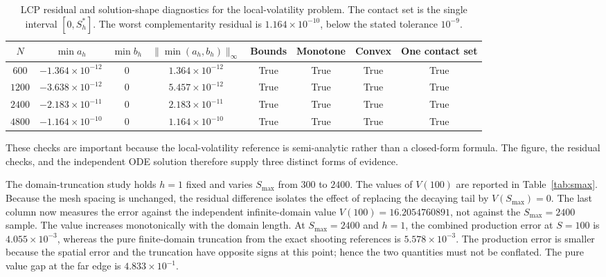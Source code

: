 \documentclass[11pt,a4paper]{article}
\theoremstyle{definition}
\theoremstyle{remark}
\begin{document}
\begin{table}[H]
\centering
\scriptsize
\setlength{\tabcolsep}{4pt}
\begin{tabular}{cccccccc}
\toprule
\textbf{$N$} & \textbf{$\min a_h$} & \textbf{$\min b_h$} &
\textbf{$\|\min(a_h,b_h)\|_\infty$} & \textbf{Bounds} &
\textbf{Monotone} & \textbf{Convex} & \textbf{One contact set} \\
\midrule
$600$  & $-1.364\times10^{-12}$ & $0$ & $1.364\times10^{-12}$ &
True & True & True & True \\
$1200$ & $-3.638\times10^{-12}$ & $0$ & $5.457\times10^{-12}$ &
True & True & True & True \\
$2400$ & $-2.183\times10^{-11}$ & $0$ & $2.183\times10^{-11}$ &
True & True & True & True \\
$4800$ & $-1.164\times10^{-10}$ & $0$ & $1.164\times10^{-10}$ &
True & True & True & True \\
\bottomrule
\end{tabular}
\caption{LCP residual and solution-shape diagnostics for the local-volatility
problem. The contact set is the single interval $[0,S_h^*]$. The worst
complementarity residual is $1.164\times10^{-10}$, below the stated
tolerance $10^{-9}$.}
\label{tab:stage2-diagnostics}
\end{table}

These checks are important because the local-volatility reference is
semi-analytic rather than a closed-form formula. The figure, the residual
checks, and the independent ODE solution therefore supply three distinct
forms of evidence.

The domain-truncation study holds $h=1$ fixed and varies $S_{\max}$ from
$300$ to $2400$. The values of $V(100)$ are reported in
Table~\ref{tab:smax}. Because the mesh spacing is unchanged, the residual
difference isolates the effect of replacing the decaying tail by
$V(S_{\max})=0$. The last column now measures the error against the
independent infinite-domain value $V(100)=16.2054760891$, not against the
$S_{\max}=2400$ sample. The value increases monotonically with the domain
length. At $S_{\max}=2400$ and $h=1$, the combined production error at
$S=100$ is $4.055\times10^{-3}$, whereas the pure finite-domain truncation
from the exact shooting references is $5.578\times10^{-3}$. The production
error is smaller because the spatial error and the truncation have opposite
signs at this point; hence the two quantities must not be conflated. The
pure value gap at the far edge is $4.833\times10^{-1}$.
\end{document}

